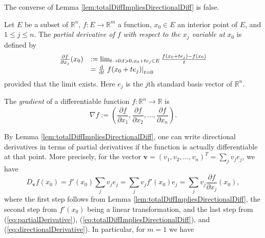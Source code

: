 \begin{rem}
  The converse of Lemma \ref{lem:totalDiffImpliesDirectionalDiff} is
  false.
\end{rem}

\begin{defn}
  \label{def:partialDerivative}
  Let $E$ be a subset of $\mathbb{R}^n$,
  $f: E\rightarrow \mathbb{R}^m$ a function,
  $x_0\in E$ an interior point of $E$,
  and $1\le j \le n$.
  The \emph{partial derivative of $f$ with respect to the $x_j$
    variable at} $x_0$ is defined by
  \begin{equation}
    \label{eq:partialDerivative}
    \begin{array}{ll}
    \frac{\partial f}{\partial x_j}(x_0) &:=
    \lim_{t\rightarrow 0; t>0, x_0+te_j\in E} \frac{f(x_0+te_j) -
      f(x_0)}{t} \\
      &= \frac{\mathrm{d}}{\mathrm{d} t} \left. f(x_0+te_j)\right|_{t=0}
    \end{array}
  \end{equation}
  provided that the limit exists.
  Here $e_j$ is the $j$th standard basis vector of $\mathbb{R}^n$.
\end{defn}

\begin{defn}
  \label{def:gradient}
  The \emph{gradient} of a differentiable function
  $f: \mathbb{R}^n\rightarrow \mathbb{R}$ is
  \begin{equation}
    \label{eq:gradient}
    \nabla f := \left(
      \frac{\partial f}{\partial x_1}, 
      \frac{\partial f}{\partial x_2}, 
      \ldots,
      \frac{\partial f}{\partial x_n}
      \right).
  \end{equation}  
\end{defn}

\begin{rem}
  By Lemma \ref{lem:totalDiffImpliesDirectionalDiff},
  one can write directional derivatives
  in terms of partial derivatives
  if the function is actually differentiable at that point.
  More precisely, for the vector
  $\mathbf{v}=(v_1, v_2, \ldots, v_n)^T=\sum_j v_j e_j$,
  we have
  \begin{displaymath}
    D_{\mathbf{v}} f(x_0) = f'(x_0) \sum_j v_j e_j = \sum_j v_j
    f'(x_0) e_j = \sum_j v_j \frac{\partial f}{\partial x_j}(x_0), 
  \end{displaymath}
  where the first step follows from Lemma
  \ref{lem:totalDiffImpliesDirectionalDiff},
  the second step from $f'(x_0)$ being a linear transformation,
  and the last step from (\ref{eq:partialDerivative}),
  (\ref{eq:totalDiffImpliesDirectionalDiff}), and
  (\ref{eq:directionalDerivative}).
  In particular, for $m=1$ we have
\end{rem}

